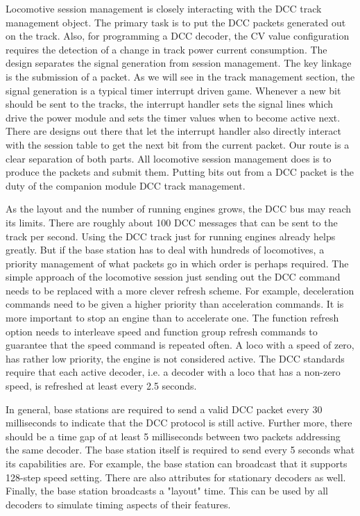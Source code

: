 Locomotive session management is closely interacting with the DCC track management object. The primary task is to put the DCC packets generated out on the track. Also, for programming a DCC decoder, the CV value configuration requires the detection of a change in track power current consumption. The design separates the signal generation from session management. The key linkage is the submission of a packet. As we will see in the track management section, the signal generation is a typical timer interrupt driven game. Whenever a new bit should be sent to the tracks, the interrupt handler sets the signal lines which drive the power module and sets the timer values when to become active next. There are designs out there that let the interrupt handler also directly interact with the session table to get the next bit from the current packet. Our route is a clear separation of both parts. All locomotive session management does is to produce the packets and submit them. Putting bits out from a DCC packet is the duty of the companion module DCC track management.

As the layout and the number of running engines grows, the DCC bus may reach its limits. There are roughly about 100 DCC messages that can be sent to the track per second. Using the DCC track just for running engines already helps greatly. But if the base station has to deal with hundreds of locomotives, a priority management of what packets go in which order is perhaps required. The simple approach of the locomotive session just sending out the DCC command needs to be replaced with a more clever refresh scheme. For example, deceleration commands need to be given a higher priority than acceleration commands. It is more important to stop an engine than to accelerate one. The function refresh option needs to interleave speed and function group refresh commands to guarantee that the speed command is repeated often. A loco with a speed of zero, has rather low priority, the engine is not considered active. The DCC standards require that each active decoder, i.e. a decoder with a loco that has a non-zero speed, is refreshed at least every 2.5 seconds.

In general, base stations are required to send a valid DCC packet every 30 milliseconds to indicate that the DCC protocol is still active. Further more, there should be a time gap of at least 5 milliseconds between two packets addressing the same decoder. The base station itself is required to send every 5 seconds what its capabilities are. For example, the base station can broadcast that it supports 128-step speed setting. There are also attributes for stationary decoders as well. Finally, the base station broadcasts a "layout" time. This can be used by all decoders to simulate timing aspects of their features.

